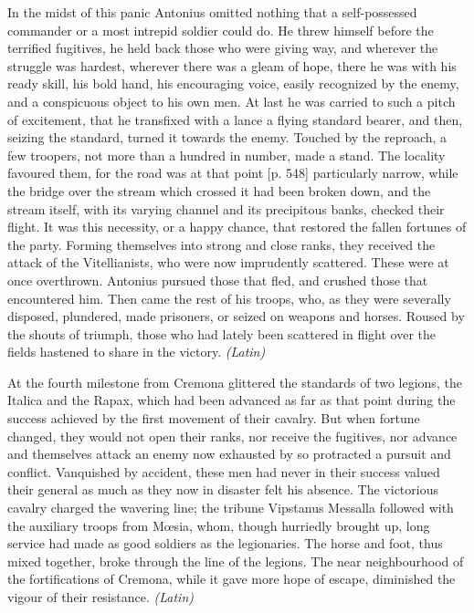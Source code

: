
In the midst of this panic Antonius omitted nothing that a self-possessed commander or a most intrepid soldier could do. He threw himself before the terrified fugitives, he held back those who were giving way, and wherever the struggle was hardest, wherever there was a gleam of hope, there he was with his ready skill, his bold hand, his encouraging voice, easily recognized by the enemy, and a conspicuous object to his own men. At last he was carried to such a pitch of excitement, that he transfixed with a lance a flying standard bearer, and then, seizing the standard, turned it towards the enemy. Touched by the reproach, a few troopers, not more than a hundred in number, made a stand. The locality favoured them, for the road was at that point [p. 548] particularly narrow, while the bridge over the stream which crossed it had been broken down, and the stream itself, with its varying channel and its precipitous banks, checked their flight. It was this necessity, or a happy chance, that restored the fallen fortunes of the party. Forming themselves into strong and close ranks, they received the attack of the Vitellianists, who were now imprudently scattered. These were at once overthrown. Antonius pursued those that fled, and crushed those that encountered him. Then came the rest of his troops, who, as they were severally disposed, plundered, made prisoners, or seized on weapons and horses. Roused by the shouts of triumph, those who had lately been scattered in flight over the fields hastened to share in the victory. \emph{(Latin)}


At the fourth milestone from Cremona glittered the standards of two legions, the Italica and the Rapax, which had been advanced as far as that point during the success achieved by the first movement of their cavalry. But when fortune changed, they would not open their ranks, nor receive the fugitives, nor advance and themselves attack an enemy now exhausted by so protracted a pursuit and conflict. Vanquished by accident, these men had never in their success valued their general as much as they now in disaster felt his absence. The victorious cavalry charged the wavering line; the tribune Vipstanus Messalla followed with the auxiliary troops from Mœsia, whom, though hurriedly brought up, long service had made as good soldiers as the legionaries. The horse and foot, thus mixed together, broke through the line of the legions. The near neighbourhood of the fortifications of Cremona, while it gave more hope of escape, diminished the vigour of their resistance. \emph{(Latin)}

